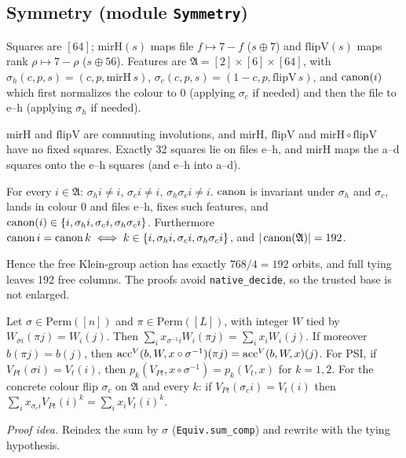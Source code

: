 \subsection{Symmetry (module \texttt{Symmetry})}

Squares are $[64]$; $\mathrm{mirH}(s)$ maps file $f\mapsto7-f$ ($s\oplus7$) and $\mathrm{flipV}(s)$ maps rank $\rho\mapsto7-\rho$ ($s\oplus56$).
Features are $\mathfrak A=[2]\times[6]\times[64]$, with $\sigma_h(c,p,s)=(c,p,\mathrm{mirH}\,s)$, $\sigma_c(c,p,s)=(1-c,p,\mathrm{flipV}\,s)$, and $\operatorname{canon}(i)$ which first normalizes the colour to $0$ (applying $\sigma_c$ if needed) and then the file to e--h (applying $\sigma_h$ if needed).

\begin{theorem}\label{thm:t19}
$\mathrm{mirH}$ and $\mathrm{flipV}$ are commuting involutions, and $\mathrm{mirH}$, $\mathrm{flipV}$ and $\mathrm{mirH}\circ\mathrm{flipV}$ have no fixed squares.
Exactly 32 squares lie on files e--h, and $\mathrm{mirH}$ maps the a--d squares onto the e--h squares (and e--h into a--d).
\end{theorem}

\begin{theorem}\label{thm:t20}
For every $i\in\mathfrak A$: $\sigma_hi\neq i$, $\sigma_ci\neq i$, $\sigma_h\sigma_ci\neq i$.
$\operatorname{canon}$ is invariant under $\sigma_h$ and $\sigma_c$, lands in colour 0 and files e--h, fixes such features, and $\operatorname{canon}(i)\in\{i,\sigma_hi,\sigma_ci,\sigma_h\sigma_ci\}$.
Furthermore $\operatorname{canon} i=\operatorname{canon} k\iff k\in\{i,\sigma_hi,\sigma_ci,\sigma_h\sigma_ci\}$, and $|\operatorname{canon}(\mathfrak A)|=192$.
\end{theorem}
\noindent Hence the free Klein-group action has exactly $768/4=192$ orbits, and full tying leaves 192 free columns. The proofs avoid \texttt{native\_decide}, so the trusted base is not enlarged.

\begin{theorem}\label{thm:t21}
Let $\sigma\in\mathrm{Perm}([n])$ and $\pi\in\mathrm{Perm}([L])$, with integer $W$ tied by $W_{\sigma i}(\pi j)=W_i(j)$.
Then $\sum_ix_{\sigma^{-1}i}W_i(\pi j)=\sum_ix_iW_i(j)$. If moreover $b(\pi j)=b(j)$, then $\mathrm{acc}^{V}(b,W,x\circ\sigma^{-1})(\pi j)=\mathrm{acc}^{V}(b,W,x)(j)$.
For PSI, if $V_{P t}(\sigma i)=V_t(i)$, then $p_k(V_{Pt},x\circ\sigma^{-1})=p_k(V_t,x)$ for $k=1,2$.
For the concrete colour flip $\sigma_c$ on $\mathfrak A$ and every $k$: if $V_{Pt}(\sigma_ci)=V_t(i)$ then $\sum_ix_{\sigma_ci}V_{Pt}(i)^k=\sum_ix_iV_t(i)^k$.
\end{theorem}
\noindent\emph{Proof idea.} Reindex the sum by $\sigma$ (\texttt{Equiv.sum\_comp}) and rewrite with the tying hypothesis.

